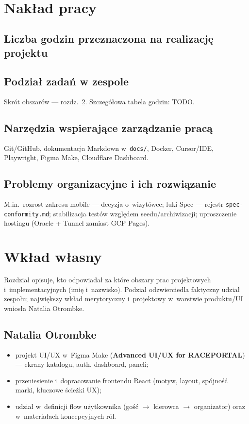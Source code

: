 \documentclass{sprz}
\begin{document}
\chapter{Nakład pracy}  
\section{Liczba godzin przeznaczona na realizację projektu}  
\section{Podział zadań w zespole}  
Skrót obszarów --- rozdz.~\ref{ch:wklad}. Szczegółowa tabela godzin: TODO.  
\section{Narzędzia wspierające zarządzanie pracą}  
Git/GitHub, dokumentacja Markdown w~\texttt{docs/}, Docker, Cursor/IDE, Playwright, Figma Make, Cloudflare Dashboard.  
\section{Problemy organizacyjne i ich rozwiązanie}  
M.in.\ rozrost zakresu mobile --- decyzja o~wizytówce; luki Spec --- rejestr \texttt{spec-conformity.md}; stabilizacja testów względem seedu/archiwizacji; uproszczenie hostingu (Oracle + Tunnel zamiast GCP Pages).  
  
\chapter{Wkład własny}  
\label{ch:wklad}  
Rozdział opisuje, kto odpowiadał za które obszary prac projektowych i~implementacyjnych (imię i~nazwisko). Podział odzwierciedla faktyczny udział zespołu; największy wkład merytoryczny i~projektowy w~warstwie produktu/UI wniosła Natalia Otrombke.  
  
\section{Natalia Otrombke}  
\begin{itemize}  
 \item projekt UI/UX w~Figma Make (\textbf{Advanced UI/UX for RACEPORTAL}) --- ekrany katalogu, auth, dashboard, paneli;  
 \item przeniesienie i~dopracowanie frontendu React (motyw, layout, spójność marki, kluczowe ścieżki UX);  
 \item udział w~definicji flow użytkownika (gość $\rightarrow$ kierowca $\rightarrow$ organizator) oraz w~materiałach koncepcyjnych ról.  
\end{itemize}  
  
\end{document}
